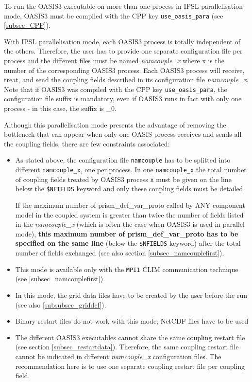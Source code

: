 To run the OASIS3 executable on more than one process in IPSL 
parallelisation mode, OASIS3 must be compiled with the CPP key 
{\tt use\_oasis\_para} (see \ref{subsec_CPP}).

With IPSL parallelisation mode, each OASIS3 process is totally 
independent of the others. Therefore, the user has to provide one separate
configuration file per process and the different files must be named 
{\it namcouple\_x} where x is the number of the corresponding OASIS3 process. 
Each OASIS3 process will receive, treat, and send the coupling fields described 
in its configuration file {\it namcouple\_x}. Note that if OASIS3 was 
   compiled with the CPP key {\tt use\_oasis\_para}, the configuration file suffix is 
   mandatory, even if OASIS3 runs in fact with only one process - in this case, 
   the suffix is {\_0}. 
 
Although this parallelisation mode presents the advantage of removing the
bottleneck that can appear when only one OASIS process receives and sends all
the coupling fields, there are few constraints associated:

\begin{itemize}
\item As stated above, the configuration file {\tt namcouple} has to be splitted
   into different {\tt namcouple\_x}, one per process. In one {\tt namcouple\_x} 
   the total number of coupling fields treated by OASIS3 process {\tt x} must be 
   given on the line below the {\tt \$NFIELDS} keyword and only these coupling 
   fields must be detailed. 
   
   If the maximum number of
  prism\_def\_var\_proto called by ANY component model in the coupled
  system is greater than twice the number of
  fields listed in the {\it namcouple\_x} (which is often the case when
  OASIS3 is used in parallel mode), {\bf this maximum number of
  prism\_def\_var\_proto has to be specified on the same line}
  (below the {\tt \$NFIELDS} keyword) after the total number of fields
  exchanged (see also section
  \ref{subsec_namcouplefirst}).
 
\item This mode is available only with the {\tt MPI1} CLIM communication 
  technique (see \ref{subsec_namcouplefirst}).
 
\item In this mode, the grid data files have to be created
  by the user before the run (see also \ref{subsubsec_griddef}). 

\item Binary restart files do not work with this mode; NetCDF files have to be used

\item The different OASIS3 executables cannot share the same
  coupling restart file (see section \ref{subsec_restartdata}). 
  Therefore, the same coupling restart file cannot be indicated in 
  different {\it namcouple\_x} configuration files. The recommendation 
  here is to use one separate coupling restart file per coupling field.

\end{itemize}

